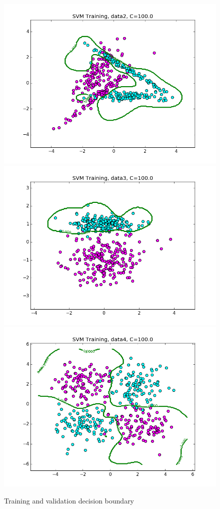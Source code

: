 \documentclass{article}
\begin{document}
\begin{figure}[width=\linewidth]
\begin{multicols}{2}
  \includegraphics[width=1.2\linewidth]{code/P2/rbf_training,C=100,data2.png}
  \includegraphics[width=1.2\linewidth]{code/P2/rbf_training,C=100,data3.png}
  \includegraphics[width=1.2\linewidth]{code/P2/rbf_training,C=100,data4.png}
\end{multicols}
\caption{Training and validation decision boundary}
\end{figure}
\end{document}
